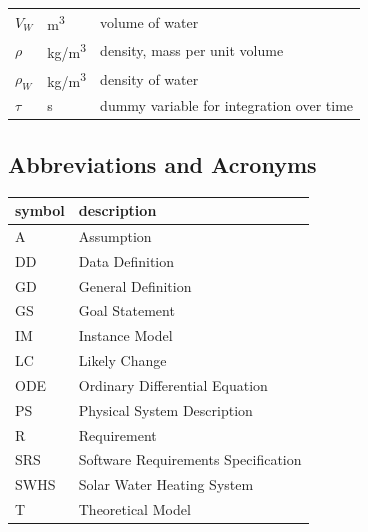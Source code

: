 \documentclass[12pt]{article}
\newcommand{\blt}{- } %
\newcommand{\progname}{SWHS}
\begin{document}
\begin{longtable*}{l l p{12cm}}
  $V_W$ & \si[per-mode=symbol] {\cubic\meter} & volume of water
  \\
  $\rho$ & \si[per-mode=symbol] {\kilogram\per\cubic\metre} & density, mass per
  unit volume
  \\
  $\rho_W$ & \si[per-mode=symbol] {\kilogram\per\cubic\metre} & density of water
  \\
  $\tau$ & \si[per-mode=symbol] {\second} & dummy variable for integration over time
  \\
  \bottomrule
\end{longtable*}



\subsection{Abbreviations and Acronyms}

\renewcommand{\arraystretch}{1.2}
\begin{tabular}{l l} 
  \toprule		
  \textbf{symbol} & \textbf{description}\\
  \midrule 
  A & Assumption\\
  DD & Data Definition\\
  GD & General Definition\\
  GS & Goal Statement\\
  IM & Instance Model\\
  LC & Likely Change\\
  ODE & Ordinary Differential Equation\\
  PS & Physical System Description\\
  R & Requirement\\
  SRS & Software Requirements Specification\\
  \progname{} & Solar Water Heating System\\
  T & Theoretical Model\\
  \bottomrule
\end{tabular}\\
\end{document}
